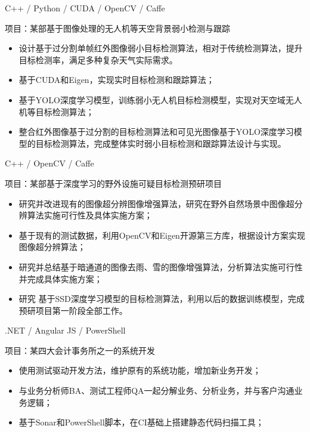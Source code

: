 \documentclass{resume}
\begin{document}
C++ / Python / CUDA / OpenCV / Caffe

项目：某部基于图像处理的无人机等天空背景弱小检测与跟踪
\begin{itemize}
  \item 设计基于过分割单帧红外图像弱小目标检测算法，相对于传统检测算法，提升目标检测率，满足多种复杂天气实际需求。
  \item 基于CUDA和Eigen，实现实时目标检测和跟踪算法；
  \item 基于YOLO深度学习模型，训练弱小无人机目标检测模型，实现对天空域无人机等目标检测算法；
  \item 整合红外图像基于过分割的目标检测算法和可见光图像基于YOLO深度学习模型的目标检测算法，完成整体实时弱小目标检测和跟踪算法设计与实现。
\end{itemize}

C++ / OpenCV / Caffe

项目：某部基于深度学习的野外设施可疑目标检测预研项目
\begin{itemize}
  \item 研究并改进现有的图像超分辨图像增强算法，研究在野外自然场景中图像超分辨算法实施可行性及具体实施方案；
  \item 基于现有的测试数据，利用OpenCV和Eigen开源第三方库，根据设计方案实现图像超分辨算法；
  \item 研究并总结基于暗通道的图像去雨、雪的图像增强算法，分析算法实施可行性并完成具体实施方案；
  \item 研究 基于SSD深度学习模型的目标检测算法，利用以后的数据训练模型，完成预研项目第一阶段全部工作。
\end{itemize}

.NET / Angular JS / PowerShell

项目：某四大会计事务所之一的系统开发
\begin{itemize}
  \item 使用测试驱动开发方法，维护原有的系统功能，增加新业务开发；
  \item 与业务分析师BA、测试工程师QA一起分解业务、分析业务，并与客户沟通业务逻辑；
  \item 基于Sonar和PowerShell脚本，在CI基础上搭建静态代码扫描工具；
\end{itemize}
\end{document}
